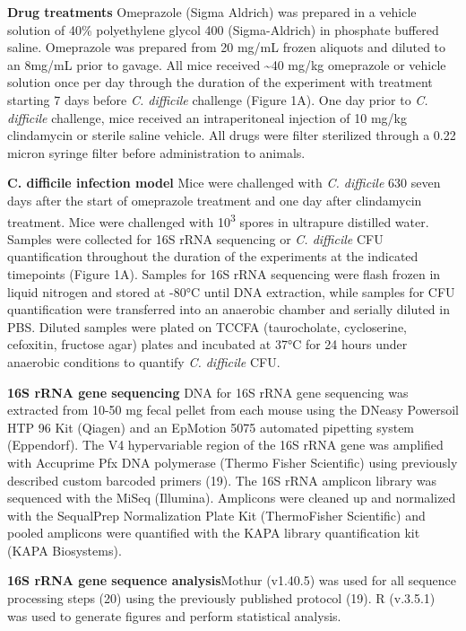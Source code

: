 \documentclass[11pt,]{article}
\begin{document}
\textbf{Drug treatments} Omeprazole (Sigma Aldrich) was prepared in a
vehicle solution of 40\% polyethylene glycol 400 (Sigma-Aldrich) in
phosphate buffered saline. Omeprazole was prepared from 20 mg/mL frozen
aliquots and diluted to an 8mg/mL prior to gavage. All mice received
\textasciitilde{}40 mg/kg omeprazole or vehicle solution once per day
through the duration of the experiment with treatment starting 7 days
before \emph{C. difficile} challenge (Figure 1A). One day prior to
\emph{C. difficile} challenge, mice received an intraperitoneal
injection of 10 mg/kg clindamycin or sterile saline vehicle. All drugs
were filter sterilized through a 0.22 micron syringe filter before
administration to animals.

\textbf{C. difficile infection model} Mice were challenged with \emph{C.
difficile} 630 seven days after the start of omeprazole treatment and
one day after clindamycin treatment. Mice were challenged with
10\textsuperscript{3} spores in ultrapure distilled water. Samples were
collected for 16S rRNA sequencing or \emph{C. difficile} CFU
quantification throughout the duration of the experiments at the
indicated timepoints (Figure 1A). Samples for 16S rRNA sequencing were
flash frozen in liquid nitrogen and stored at -80°C until DNA
extraction, while samples for CFU quantification were transferred into
an anaerobic chamber and serially diluted in PBS. Diluted samples were
plated on TCCFA (taurocholate, cycloserine, cefoxitin, fructose agar)
plates and incubated at 37°C for 24 hours under anaerobic conditions to
quantify \emph{C. difficile} CFU.

\textbf{16S rRNA gene sequencing} DNA for 16S rRNA gene sequencing was
extracted from 10-50 mg fecal pellet from each mouse using the DNeasy
Powersoil HTP 96 Kit (Qiagen) and an EpMotion 5075 automated pipetting
system (Eppendorf). The V4 hypervariable region of the 16S rRNA gene was
amplified with Accuprime Pfx DNA polymerase (Thermo Fisher Scientific)
using previously described custom barcoded primers (19). The 16S rRNA
amplicon library was sequenced with the MiSeq (Illumina). Amplicons were
cleaned up and normalized with the SequalPrep Normalization Plate Kit
(ThermoFisher Scientific) and pooled amplicons were quantified with the
KAPA library quantification kit (KAPA Biosystems).

\textbf{16S rRNA gene sequence analysis}Mothur (v1.40.5) was used for
all sequence processing steps (20) using the previously published
protocol (19). R (v.3.5.1) was used to generate figures and perform
statistical analysis.
\end{document}
